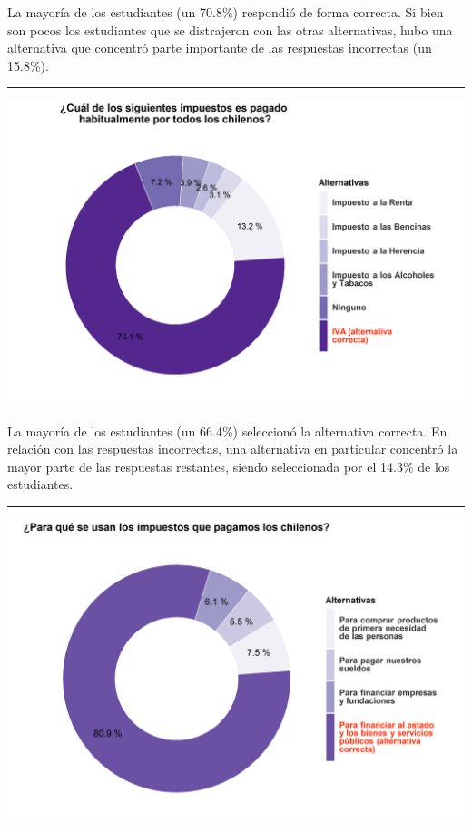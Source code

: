 \documentclass[
  14pt,
]{book}
\let\origfigure\figure
\let\endorigfigure\endfigure
\renewenvironment{figure}[1][2] {
  \expandafter\origfigure\expandafter[H]
} {
  \endorigfigure
}
\begin{document}
La mayoría de los estudiantes (un 70.8\%) respondió de forma correcta. Si bien son pocos los estudiantes que se distrajeron con las otras alternativas, hubo una alternativa que concentró parte importante de las respuestas incorrectas (un 15.8\%).

\begin{center}\rule{0.5\linewidth}{0.5pt}\end{center}

\begin{figure}[!ht]

{\centering \includegraphics[width=0.8\linewidth,]{images/ccivico_7} 

}

\caption{Impuesto pagado por todos los chilenos}\label{fig:unnamed-chunk-11}
\end{figure}

La mayoría de los estudiantes (un 66.4\%) seleccionó la alternativa correcta. En relación con las respuestas incorrectas, una alternativa en particular concentró la mayor parte de las respuestas restantes, siendo seleccionada por el 14.3\% de los estudiantes.

\begin{center}\rule{0.5\linewidth}{0.5pt}\end{center}

\begin{figure}[!ht]

{\centering \includegraphics[width=0.8\linewidth,]{images/ccivico_8} 

}

\caption{Uso de los impuestos en Chile}\label{fig:unnamed-chunk-12}
\end{figure}
\end{document}
